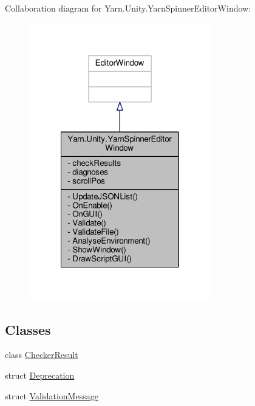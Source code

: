 Collaboration diagram for Yarn.\-Unity.\-Yarn\-Spinner\-Editor\-Window\-:
\nopagebreak
\begin{figure}[H]
\begin{center}
\leavevmode
\includegraphics[width=224pt]{d0/dc5/a00343}
\end{center}
\end{figure}
\subsection*{Classes}
\begin{DoxyCompactItemize}
\item 
class \hyperlink{a00024}{Checker\-Result}
\item 
struct \hyperlink{a00034}{Deprecation}
\item 
struct \hyperlink{a00085_dc/de6/a00167}{Validation\-Message}
\end{DoxyCompactItemize}
